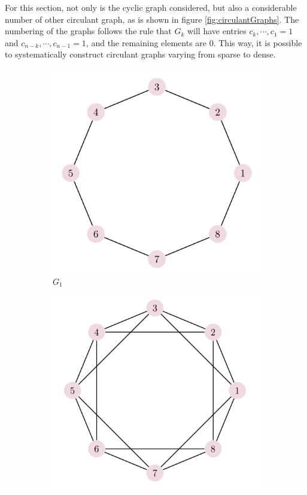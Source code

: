 \documentclass[../../dissertation.tex]{subfiles}
\begin{document}
For this section, not only is the cyclic graph considered, but also a considerable
number of other circulant graph, as is shown in figure
\ref{fig:circulantGraphs}. The numbering of the graphs follows the rule that
$G_k$ will have entries $c_k, \cdots, c_1 = 1$ and $c_{n-k},\cdots,c_{n-1} =
1$, and the remaining elements are $0$. This way, it is possible to
systematically construct circulant graphs varying from sparse to dense.  
\begin{figure}[!h]
  \centering
  \begin{subfigure}[t]{.23\textwidth}
    \centering
    \includegraphics[width=\linewidth]{img/Qiskit/ContQuantumWalk/Graphs/graph0.png}
    \caption{$G_1$}
  \end{subfigure}
  \begin{subfigure}[t]{.23\textwidth}
    \centering
    \includegraphics[width=\linewidth]{img/Qiskit/ContQuantumWalk/Graphs/graph1.png}

\end{subfigure}
\end{figure}
\end{document}
